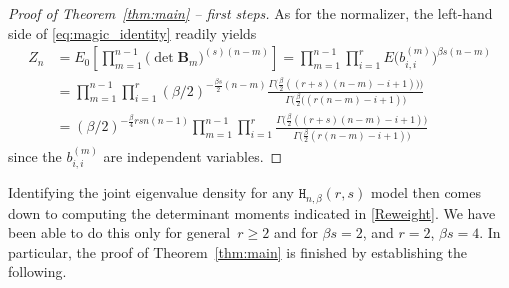 \documentclass[pdftex]{sigma}
\numberwithin{equation}{section}
\theoremstyle{definition}
\newcommand{\mbf}[1]{\mathbf{#1}}
\newcommand{\HH}{\mathtt{H}_{n,\beta}}
\begin{document}
\begin{proof}[Proof of Theorem~\ref{thm:main} -- first steps]
As for the normalizer, the left-hand side of \eqref{eq:magic_identity} readily yields
\begin{align}
 Z_n &= E_{0} \left[ \prod_{m=1}^{n-1}\bigl(\det \mbf{B}_m\bigr)^{(s)(n-m)} \right]
 = \prod_{m=1}^{n-1} \prod_{i=1}^r E \bigl(b^{(m)}_{i,i}\bigr)^{\beta s(n-m)}\nonumber \\
 & =
\prod_{m=1}^{n-1} \prod_{i=1}^r
(\beta/2) ^{-\frac{\beta s}{2}(n-m)}\frac{ \Gamma \bigl(\frac{\beta}{2}((r+s)(n-m)-i+1 ))\bigr)}{\Gamma \bigl(\frac{\beta}{2}{((r(n-m)-i+1) }\bigr)} \nonumber
\\&=(\beta/2)^{-\frac{\beta }{4} r s n(n-1)} \prod_{m=1}^{n-1} \prod_{i=1}^r
\frac{ \Gamma \bigl(\frac{\beta}{2}((r+s)(n-m)-i+1 )\bigr)}{\Gamma \bigl(\frac{\beta}{2}(r(n-m)-i+1) \bigr)}
\label{eq:bias_const}
\end{align}
since the $b^{(m)}_{i,i}$ are independent 
variables.
\end{proof}

Identifying the joint eigenvalue density for any $\HH(r,s)$ model then comes down to computing the determinant moments indicated in \eqref{Reweight}. We have been able to do this only for general~${r\ge 2}$ and for $\beta s=2$, and $r=2$, $\beta s=4$.
In particular, the proof of Theorem~\ref{thm:main} is finished by establishing the following.
\end{document}
